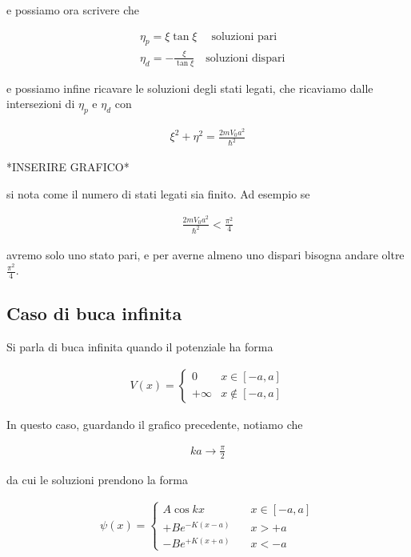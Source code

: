 e possiamo ora scrivere che

\begin{align}
{}&\eta_p= \xi \tan{\xi} \quad \; \text{soluzioni pari} \\
&\eta_d= -\frac{\xi}{\tan{\xi}}  \quad \text{soluzioni dispari}
\end{align}

e possiamo infine ricavare le soluzioni degli stati legati, che ricaviamo dalle intersezioni di $\eta_p$ e $\eta_d$ con

\begin{align}
\xi^2 + \eta^2 = \frac{2mV_0a^2}{\hbar^2}
\end{align}

*INSERIRE GRAFICO*

si nota come il numero di stati legati sia finito. Ad esempio se

\begin{align}
\frac{2mV_0a^2}{\hbar^2} <\frac{\pi^2}{4}
\end{align}

avremo solo uno stato pari, e per averne almeno uno dispari bisogna andare oltre $\frac{\pi^2}{4}$.

\newpage

\subsection{Caso di buca infinita}

Si parla di buca infinita quando il potenziale ha forma

\begin{align}
V(x)= \left\{
\begin{array}{cc}
0 \quad {}&x \in [-a,a]\\
+\infty  &x \notin [-a,a]
\end{array}
\right.
\end{align}

In questo caso, guardando il grafico precedente, notiamo che

\begin{align}
ka \rightarrow \frac{\pi}{2}
\end{align}

da cui le soluzioni prendono la forma

\begin{align}
\psi(x)=
\left\{
\begin{array}{ccc}
A\cos{kx} \quad {}& x\in [-a,a] \\
+Be^{-K(x-a)} \quad &x>+a \\
-Be^{+K(x+a)} \quad &x<-a
\end{array} 
\right.
\end{align}

